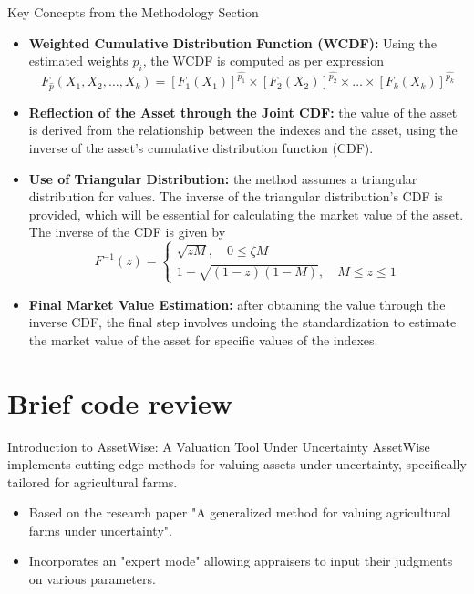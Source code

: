 \documentclass{beamer}
\begin{document}
\begin{frame}[allowframebreaks]{Key Concepts from the Methodology Section}
\begin{itemize}
       	\item \textbf{Weighted Cumulative Distribution Function (WCDF):} Using the estimated weights \(p_{i}\), the WCDF is computed as per expression
       	\begin{equation}
       		F_{\hat{p}}(X_{1}, X_{2}, \ldots, X_{k}) = [F_{1}(X_{1})]^{\hat{p_{1}}} \times [F_{2}(X_{2})]^{\hat{p_{2}}} \times \ldots \times [F_{k}(X_{k})]^{\hat{p_{k}}}
       	\end{equation}
       \item \textbf{Reflection of the Asset through the Joint CDF:} the value of the asset is derived from the relationship between the indexes and the asset, using the inverse of the asset's cumulative distribution function (CDF).
       \item \textbf{Use of Triangular Distribution:} the method assumes a triangular distribution for values. The inverse of the triangular distribution's CDF is provided, which will be essential for calculating the market value of the asset. The inverse of the CDF is given by
       \begin{equation}
           F^{-1}(z) =
           \begin{cases}
               \sqrt{z M}, \quad 0 \leq \zeta M \\
               1 - \sqrt{(1 - z)(1 - M)}, \quad M \leq z \leq 1
           \end{cases}
       \end{equation}       
       \item \textbf{Final Market Value Estimation:} after obtaining the value through the inverse CDF, the final step involves undoing the standardization to estimate the market value of the asset for specific values of the indexes.
    \end{itemize}
\end{frame}

\section{Brief code review}

\begin{frame}{Introduction to AssetWise: A Valuation Tool Under Uncertainty}
	AssetWise implements cutting-edge methods for valuing assets under uncertainty, 
	specifically tailored for agricultural farms. 
	\begin{itemize}
		\item Based on the research paper "A generalized method for valuing agricultural farms under uncertainty".
		\item Incorporates an "expert mode" allowing appraisers to input their judgments on various parameters.
	\end{itemize}
\end{frame}
\end{document}
